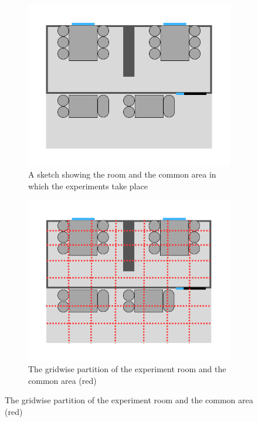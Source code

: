 \begin{figure}
    \centering
    \begin{subfigure}[b]{0.49\textwidth}
        \centering
        \includegraphics[width=\textwidth]{images/experiment_room.png}
        \caption{A sketch showing the room and the common area in which the experiments take place}
        \label{fig:experiment_room}
    \end{subfigure}
    \begin{subfigure}[b]{0.49\textwidth}
        \centering
        \includegraphics[width=\textwidth]{images/roomwithgrid.png}
        \caption{The gridwise partition of the experiment room and the common area (red)}

\end{subfigure}
\end{figure}
